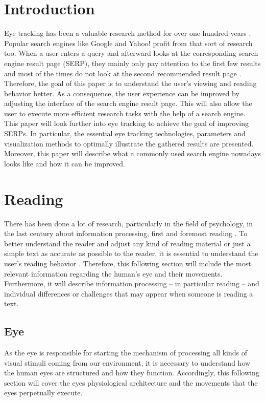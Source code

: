 \section{Introduction}
\label{section:Introduction}
Eye tracking has been a valuable research method for over one hundred years \autocite{biedert2010eyebook}. Popular search engines like Google and Yahoo! profit from that sort of research too. When a user enters a query and afterward looks at the corresponding search engine result page (SERP), they mainly only pay attention to the first few results and most of the times do not look at the second recommended result page \autocite{lorigo2008eye, liu2015influence}.\\
Therefore, the goal of this paper is to understand the user's viewing and reading behavior better. As a consequence, the user experience can be improved by adjusting the interface of the search engine result page. This will also allow the user to execute more efficient research tasks with the help of a search engine.\\
This paper will look further into eye tracking to achieve the goal of improving SERPs. In particular, the essential eye tracking technologies, parameters and visualization methods to optimally illustrate the gathered results are presented. Moreover, this paper will describe what a commonly used search engine nowadays looks like and how it can be improved.


\section{Reading}
\label{section:Reading}
There has been done a lot of research, particularly in the field of psychology, in the last century about information processing, first and foremost reading \autocite{rayner1998eye, biedert2010eyebook}. 
To better understand the reader and adjust any kind of reading material or just a simple text as accurate as possible to the reader, it is essential to understand the user's reading behavior \autocite{biedert2010eyebook}. 
Therefore, this following section will include the most relevant information regarding the human's eye and their movements. Furthermore, it will describe information processing -- in particular reading -- and individual differences or challenges that may appear when someone is reading a text.

\subsection{Eye}
\label{subsection:Eye}
As the eye is responsible for starting the mechanism of processing all kinds of visual stimuli coming from our environment, it is necessary to understand how the human eyes are structured and how they function. Accordingly, this following section will cover the eyes physiological architecture and the movements that the eyes perpetually execute.

